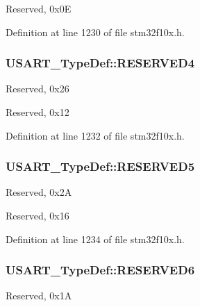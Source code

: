 Reserved, 0x0\-E 

Definition at line 1230 of file stm32f10x.\-h.

\hypertarget{struct_u_s_a_r_t___type_def_a6ac527c7428ad8807a7740c1f33f0351}{
\subsubsection[{R\-E\-S\-E\-R\-V\-E\-D4}]{ U\-S\-A\-R\-T\-\_\-\-Type\-Def\-::\-R\-E\-S\-E\-R\-V\-E\-D4}}\label{struct_u_s_a_r_t___type_def_a6ac527c7428ad8807a7740c1f33f0351}
Reserved, 0x26

Reserved, 0x12 

Definition at line 1232 of file stm32f10x.\-h.

\hypertarget{struct_u_s_a_r_t___type_def_aa893512291681dfbecc5baa899cfafbf}{
\subsubsection[{R\-E\-S\-E\-R\-V\-E\-D5}]{ U\-S\-A\-R\-T\-\_\-\-Type\-Def\-::\-R\-E\-S\-E\-R\-V\-E\-D5}}\label{struct_u_s_a_r_t___type_def_aa893512291681dfbecc5baa899cfafbf}
Reserved, 0x2\-A

Reserved, 0x16 

Definition at line 1234 of file stm32f10x.\-h.

\hypertarget{struct_u_s_a_r_t___type_def_acd89bb1cba0381c2be8a551e6d14e9f7}{
\subsubsection[{R\-E\-S\-E\-R\-V\-E\-D6}]{ U\-S\-A\-R\-T\-\_\-\-Type\-Def\-::\-R\-E\-S\-E\-R\-V\-E\-D6}}\label{struct_u_s_a_r_t___type_def_acd89bb1cba0381c2be8a551e6d14e9f7}
Reserved, 0x1\-A 

